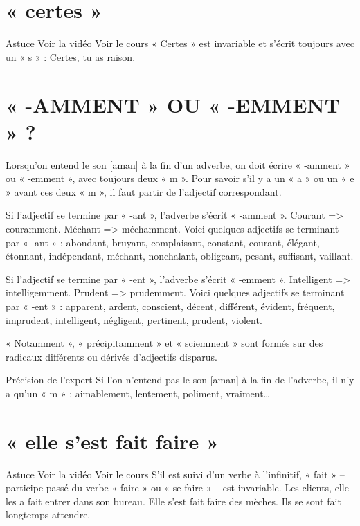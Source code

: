 \section{« certes »}

Astuce Voir la vidéo Voir le cours
« Certes » est invariable et s'écrit toujours avec un « s » : Certes, tu as raison.


\section{« -AMMENT » OU « -EMMENT » ?}

Lorsqu'on entend le son [aman] à la fin d'un adverbe, on doit écrire « ‑amment » ou « ‑emment », avec toujours deux « m ».
Pour savoir s'il y a un « a » ou un « e » avant ces deux « m », il faut partir de l'adjectif correspondant.

Si l'adjectif se termine par « ‑ant », l'adverbe s'écrit « ‑amment ».
Courant => couramment.
Méchant => méchamment.
Voici quelques adjectifs se terminant par « ‑ant » : abondant, bruyant, complaisant, constant, courant, élégant, étonnant, indépendant, méchant, nonchalant, obligeant, pesant, suffisant, vaillant.

Si l'adjectif se termine par « ‑ent », l'adverbe s'écrit « ‑emment ».
Intelligent => intelligemment.
Prudent => prudemment.
Voici quelques adjectifs se terminant par « ‑ent » : apparent, ardent, conscient, décent, différent, évident, fréquent, imprudent, intelligent, négligent, pertinent, prudent, violent.

« Notamment », « précipitamment » et « sciemment » sont formés sur des radicaux différents ou dérivés d'adjectifs disparus.

Précision de l'expert
Si l'on n'entend pas le son [aman] à la fin de l'adverbe, il n'y a qu'un « m » : aimablement, lentement, poliment, vraiment…


\section{« elle s'est fait faire »}

Astuce Voir la vidéo Voir le cours
S'il est suivi d'un verbe à l'infinitif, « fait » – participe passé du verbe « faire » ou « se faire » – est invariable.
Les clients, elle les a fait entrer dans son bureau.
Elle s'est fait faire des mèches.
Ils se sont fait longtemps attendre.

\section{}


